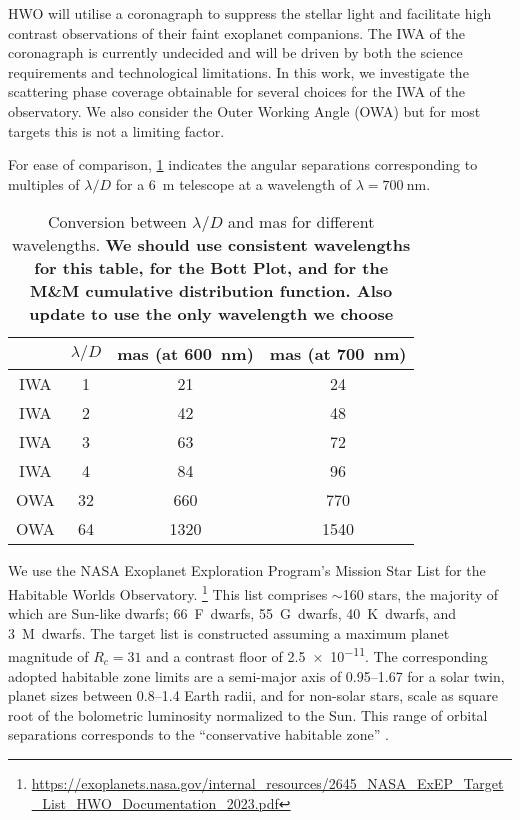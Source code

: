 \documentclass[
    usenatbib,
]{mnras}
\begin{document}
HWO will utilise a coronagraph to suppress the stellar light and facilitate high contrast observations of their faint exoplanet companions.  The IWA of the coronagraph is currently undecided and will be driven by both the science requirements and technological limitations. 
In this work, we investigate the scattering phase coverage obtainable for several choices for the IWA of the observatory. We also consider the Outer Working Angle (OWA) but for most targets this is not a limiting factor.

For ease of comparison, \cref{tab:IWA_OWA} indicates the angular separations corresponding to multiples of $\lambda / D$ for a \SI{6}{\meter} telescope at a wavelength of $\lambda = \SI{700}{\nano\meter}$.

\begin{table}
    \centering
    \caption{
        Conversion between $\lambda / D$ and mas for different wavelengths. \textbf{We should use consistent wavelengths for this table, for the Bott Plot, and for the M\&M cumulative distribution function. Also update to use the only wavelength we choose}
    }
    \label{tab:IWA_OWA}
    \begin{tabular}{ c c c c } 
    \toprule
     & $\lambda/D$ & mas (at \SI{600}{\nano\meter}) & mas (at \SI{700}{\nano\meter}) \\
    \midrule
    \midrule
    IWA & 1 & 21 & 24\\
    IWA & 2 & 42 & 48\\
    IWA & 3 & 63 & 72\\
    IWA & 4& 84& 96\\
    \midrule
    OWA & 32 & 660 & 770 \\
    OWA & 64 & 1320 & 1540\\
    \bottomrule
    \end{tabular}
\end{table}


We use the NASA Exoplanet Exploration Program's Mission Star List for the Habitable Worlds Observatory.%
\footnote{\url{https://exoplanets.nasa.gov/internal_resources/2645_NASA_ExEP_Target_List_HWO_Documentation_2023.pdf}}
This list comprises $\sim$160 stars, the majority of which are Sun-like dwarfs; 66~F~dwarfs, 55~G~dwarfs, 40~K~dwarfs, and 3~M~dwarfs.
The target list is constructed assuming a maximum planet magnitude of $R_c = 31$ and a contrast floor of \num{2.5e-11}. %
The corresponding adopted
habitable zone limits are a semi-major axis of \SIrange{0.95}{1.67}{\au} for a solar twin, planet sizes between \SIrange{0.8}{1.4}{} Earth radii, and for non-solar stars, scale as square root of the
bolometric luminosity normalized to the Sun. This range of orbital separations
corresponds to the \enquote{conservative habitable zone} \citep{kasting93, kopparapu13}.
\end{document}

